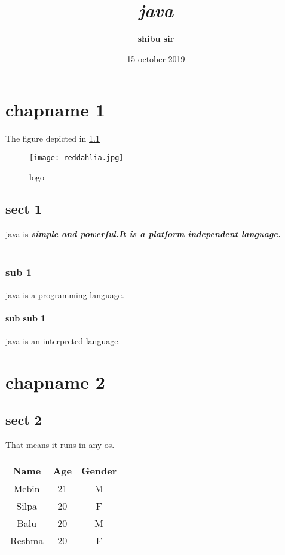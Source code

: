 \documentclass[12pt]{report}
\begin{document}
\title{\textit{java}}
\author{\textbf{shibu sir}}

\date{ 15 october 2019 }
\maketitle

\chapter{chapname 1}
The figure depicted in \ref{f:L1}
\begin{figure}[H]
\centering
\texttt{[image: reddahlia.jpg]}
\caption{logo}
\label{f:L1}

\end{figure}

\section{sect 1}
java is \textit{\textbf{simple and powerful.It is a platform independent language.}}\\ \\
\subsection*{sub 1}
java is a programming language.
\subsubsection*{sub sub 1}
java is an interpreted language.

\chapter{chapname 2}
\section{sect 2}That means it runs in any os.\\
\begin{center}

\begin{tabular}{|c|c|c|}
\hline
Name & Age & Gender \\
\hline
Mebin & 21 & M \\
\hline
Silpa & 20 & F \\
\hline
Balu  & 20 & M  \\
\hline
Reshma & 20 & F \\
\hline


\end{tabular}
\end{center}
\end{document}
